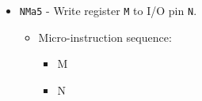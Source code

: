 \documentclass{article}
\begin{document}
\begin{itemize}
    \item \Verb|NMa5| - Write register \Verb|M| to I/O pin \Verb|N|.
   \begin{itemize}
        \item Micro-instruction sequence:
        \begin{itemize}
            \item \regtodata M
            \item \datatopin N
        \end{itemize}
    \end{itemize}
\end{itemize}
\end{document}
